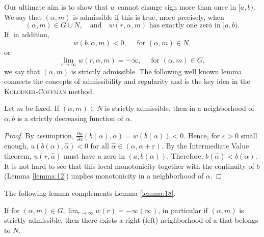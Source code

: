 Our ultimate aim is to show that $w$ cannot change sign more than once in $[a, b)$.
We say that $(\alpha, m)$ is admissible if this is true, more precisely,
when
\begin{equation}\label{eq:4.5}
  (\alpha, m) \in G \cup N, \quad \text{and}
    \quad w(r, \alpha, m) \text{ has exactly one zero in } [a, b).
\end{equation} 
If, in addition,
\begin{equation}\label{eq:4.6}
  w(b, \alpha, m)<0, \quad \text { for }(\alpha, m) \in N,
\end{equation}
or
\begin{equation}\label{eq:4.7}
  \lim _{r \rightarrow \infty} w(r, \alpha, m)=-\infty, \quad \text { for }(\alpha, m) \in G,  
\end{equation}
we say that $(\alpha, m)$ is strictly admissible. The following well known lemma connects the
concepts of admissibility and regularity and is the key idea in the
\textsc{Kolodner}-\textsc{Coffman} method.

\begin{lemma}\label{lemma:18}
  Let $m$ be fixed. If $(\alpha, m) \in N$ is strictly admissible,
  then in a neighborhood of $\alpha, b$ is a strictly decreasing function of $\alpha$.
\end{lemma}

\begin{proof}
  By assumption, $\frac{\partial u}{\partial \alpha}(b(\alpha), \alpha)=w(b(\alpha))<0$.
  Hence, for $\varepsilon>0$ small enough, $u(b(\alpha), \hat{\alpha})<0$
  for all $\hat{\alpha} \in(\alpha, \alpha+\varepsilon)$. By the Intermediate Value theorem,
  $u(r, \hat{\alpha})$ must have a zero in $(a, b(\alpha))$.
  Therefore, $b(\hat{\alpha})<b(\alpha)$.
  It is not hard to see that this local monotonicity together with the continuity
  of $b$ (Lemma \ref{lemma:12}) implies monotonicity in a neighborhood of $\alpha$.
\end{proof}

The following lemma complements Lemma \ref{lemma:18}.

\begin{lemma}\label{lemma:19}
  If for $(\alpha, m) \in G, \lim _{r \rightarrow \infty} w(r)=-\infty(\infty)$,
  in particular if $(\alpha, m)$ is strictly admissible,
  then there exists a right (left) neighborhood of a that belongs to $N$.
\end{lemma}

